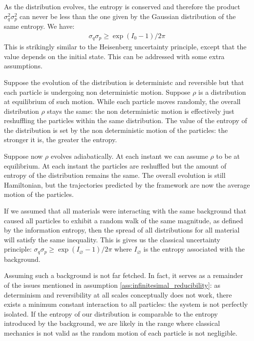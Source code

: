 \documentclass[aps,pra,10pt,twocolumn,floatfix,nofootinbib]{revtex4-1}
\numberwithin{equation}{section}
\theoremstyle{definition}
\begin{document}
As the distribution evolves, the entropy is conserved and therefore the product $\sigma_q^2 \sigma_p^2$ can never be less than the one given by the Gaussian distribution of the same entropy. We have:
\begin{align*}
\sigma_q\sigma_p \geq \exp (I_0 - 1) / 2 \pi 
\end{align*}
This is strikingly similar to the Heisenberg uncertainty principle, except that the value depends on the initial state. This can be addressed with some extra assumptions.

Suppose the evolution of the distribution is deterministc and reversible but that each particle is undergoing non deterministic motion. Suppose $\rho$ is a distribution at equilibrium of such motion. While each particle moves randomly, the overall distribution $\rho$ stays the same: the non deterministic motion is effectively just reshuffling the particles within the same distribution. The value of the entropy of the distribution is set by the non deterministic motion of the particles: the stronger it is, the greater the entropy.

Suppose now $\rho$ evolves adiabatically. At each instant we can assume $\rho$ to be at equilibrium. At each instant the particles are reshuffled but the amount of entropy of the distribution remains the same. The overall evolution is still Hamiltonian, but the trajectories predicted by the framework are now the average motion of the particles. 

If we assumed that all materials were interacting with the same background that caused all particles to exhibit a random walk of the same magnitude, as defined by the information entropy, then the spread of all distributions for all material will satisfy the same inequality. This is gives us the classical uncertainty principle: $\sigma_q\sigma_p \geq \exp (I_\varnothing - 1) / 2 \pi $ where $I_\varnothing$ is the entropy associated with the background.

Assuming such a background is not far fetched. In fact, it serves as a remainder of the issues mentioned in assumption \ref{ass:infinitesimal_reducibility}: as determinism and reversibility at all scales conceptually does not work, there exists a minimum constant interaction to all particles: the system is not perfectly isolated. If the entropy of our distribution is comparable to the entropy introduced by the background, we are likely in the range where classical mechanics is not valid as the random motion of each particle is not negligible.
\end{document}
